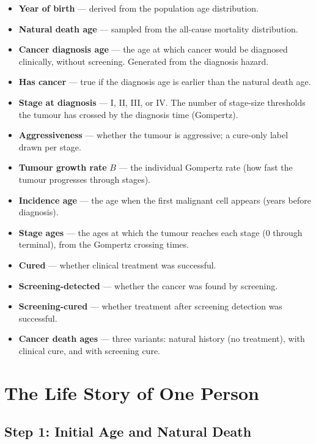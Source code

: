 \documentclass[12pt,a4paper]{article}
\begin{document}
\begin{itemize}[nosep]
    \item \textbf{Year of birth} --- derived from the population age distribution.
    \item \textbf{Natural death age} --- sampled from the all-cause mortality distribution.
    \item \textbf{Cancer diagnosis age} --- the age at which cancer would be diagnosed clinically, without screening. Generated from the diagnosis hazard.
    \item \textbf{Has cancer} --- true if the diagnosis age is earlier than the natural death age.
    \item \textbf{Stage at diagnosis} --- I, II, III, or IV. The number of stage-size thresholds the tumour has crossed by the diagnosis time (Gompertz).
    \item \textbf{Aggressiveness} --- whether the tumour is aggressive; a cure-only label drawn per stage.
    \item \textbf{Tumour growth rate} \; $B$ --- the individual Gompertz rate (how fast the tumour progresses through stages).
    \item \textbf{Incidence age} --- the age when the first malignant cell appears (years before diagnosis).
    \item \textbf{Stage ages} --- the ages at which the tumour reaches each stage (0 through terminal), from the Gompertz crossing times.
    \item \textbf{Cured} --- whether clinical treatment was successful.
    \item \textbf{Screening-detected} --- whether the cancer was found by screening.
    \item \textbf{Screening-cured} --- whether treatment after screening detection was successful.
    \item \textbf{Cancer death ages} --- three variants: natural history (no treatment), with clinical cure, and with screening cure.
\end{itemize}

\section{The Life Story of One Person}

\subsection{Step 1: Initial Age and Natural Death}
\end{document}
